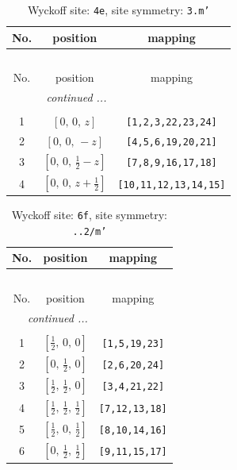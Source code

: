 \documentclass[fleqn,8pt]{jsarticle}
\begin{document}
\renewcommand{\arraystretch}{1.2}
\begin{longtable}{ccc}
\caption{Wyckoff site: {\tt 4e}, site symmetry: {\tt 3.m'}}
 \\
 \hline \hline
No. & position & mapping \\ \hline \endfirsthead

\multicolumn{2}{l}{\tablename\ \thetable{}} \\
 \hline \hline
No. & position & mapping \\ \hline \endhead

 \hline \hline
\multicolumn{2}{r}{\footnotesize\it continued ...} \\ \endfoot

 \hline \hline
\multicolumn{2}{r}{} \\ \endlastfoot

1 & $\left[ 0,\, 0,\, z \right]$ & {\tt [1,2,3,22,23,24]} \\ \hline
2 & $\left[ 0,\, 0,\, - z \right]$ & {\tt [4,5,6,19,20,21]} \\ \hline
3 & $\left[ 0,\, 0,\, \frac{1}{2} - z \right]$ & {\tt [7,8,9,16,17,18]} \\ \hline
4 & $\left[ 0,\, 0,\, z + \frac{1}{2} \right]$ & {\tt [10,11,12,13,14,15]} \\
\end{longtable}
\renewcommand{\arraystretch}{1.2}
\begin{longtable}{ccc}
\caption{Wyckoff site: {\tt 6f}, site symmetry: {\tt ..2/m'}}
 \\
 \hline \hline
No. & position & mapping \\ \hline \endfirsthead

\multicolumn{2}{l}{\tablename\ \thetable{}} \\
 \hline \hline
No. & position & mapping \\ \hline \endhead

 \hline \hline
\multicolumn{2}{r}{\footnotesize\it continued ...} \\ \endfoot

 \hline \hline
\multicolumn{2}{r}{} \\ \endlastfoot

1 & $\left[ \frac{1}{2},\, 0,\, 0 \right]$ & {\tt [1,5,19,23]} \\ \hline
2 & $\left[ 0,\, \frac{1}{2},\, 0 \right]$ & {\tt [2,6,20,24]} \\ \hline
3 & $\left[ \frac{1}{2},\, \frac{1}{2},\, 0 \right]$ & {\tt [3,4,21,22]} \\ \hline
4 & $\left[ \frac{1}{2},\, \frac{1}{2},\, \frac{1}{2} \right]$ & {\tt [7,12,13,18]} \\ \hline
5 & $\left[ \frac{1}{2},\, 0,\, \frac{1}{2} \right]$ & {\tt [8,10,14,16]} \\ \hline
6 & $\left[ 0,\, \frac{1}{2},\, \frac{1}{2} \right]$ & {\tt [9,11,15,17]} \\
\end{longtable}
\end{document}
